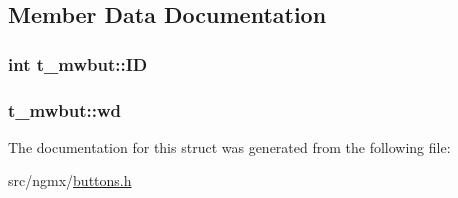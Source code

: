 \subsection{\-Member \-Data \-Documentation}
\hypertarget{structt__mwbut_a900392e24406775d7e2b9de79f8a3bc9}{
\subsubsection[{\-I\-D}]{\setlength{\rightskip}{0pt plus 5cm}int {\bf t\-\_\-mwbut\-::\-I\-D}}}\label{structt__mwbut_a900392e24406775d7e2b9de79f8a3bc9}
\hypertarget{structt__mwbut_aa425915f09964bba45283d1e9647c29f}{
\subsubsection[{wd}]{ {\bf t\-\_\-mwbut\-::wd}}}\label{structt__mwbut_aa425915f09964bba45283d1e9647c29f}


\-The documentation for this struct was generated from the following file\-:\begin{DoxyCompactItemize}
\item 
src/ngmx/\hyperlink{buttons_8h}{buttons.\-h}\end{DoxyCompactItemize}
